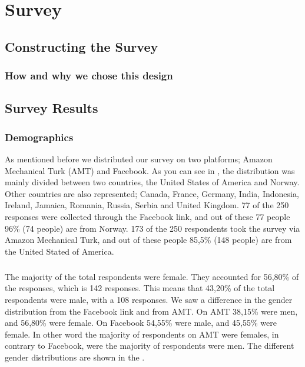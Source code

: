 \chapter{Survey}
\label{chp:amtsurvey} 

\section{Constructing the Survey}

\subsection{How and why we chose this design}

\section{Survey Results}

\subsection{Demographics}
As mentioned before we distributed our survey on two platforms; Amazon Mechanical Turk (AMT) and Facebook. As you can see in , the distribution was mainly divided between two countries, the United States of America and Norway. Other countries are also represented; Canada, France, Germany, India, Indonesia, Ireland, Jamaica, Romania, Russia, Serbia and United Kingdom. 77 of the 250 responses were collected through the Facebook link, and out of these 77 people 96\% (74 people) are from Norway. 173 of the 250 respondents took the survey via Amazon Mechanical Turk, and out of these people 85,5\% (148 people) are from the United Stated of America. 

\paragraph{}
The majority of the total respondents were female. They accounted for 56,80\% of the responses, which is 142 responses. This means that 43,20\% of the total respondents were male, with a 108 responses. We saw a difference in the gender distribution from the Facebook link and from AMT. On AMT 38,15\% were men, and 56,80\% were female. On Facebook 54,55\% were male, and 45,55\% were female. In other word the majority of respondents on AMT were females, in contrary to Facebook, were the majority of respondents were men. The different gender distributions are shown in the .
 
